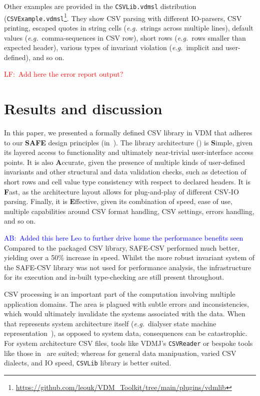 \documentclass[runningheads,a4paper]{llncs}
\newcommand{\abcomment}[1]{{\scriptsize\textcolor{blue}{AB:~#1}}}  %
\newcommand{\lfcomment}[1]{{\scriptsize\textcolor{red}{LF:~#1}}}  %
\begin{document}
Other examples are provided in the \texttt{CSVLib.vdmsl} distribution (\texttt{CSVExample.vdmsl}\footnote{\url{https://github.com/leouk/VDM_Toolkit/tree/main/plugins/vdmlib}}. They show CSV parsing with different IO-parsers, CSV printing, escaped quotes in string cells (\textit{e.g.}~strings across multiple lines), default values (\textit{e.g.}~comma-sequences in CSV row), short rows (\textit{e.g.}~rows smaller than expected header), various types of invariant violation (\textit{e.g.}~implicit and user-defined), and so on. 

\lfcomment{Add here the error report output?}

\section{Results and discussion}\label{sec:Results}

In this paper, we presented a formally defined CSV library in VDM that adheres to our \textbf{SAFE} design principles (in~). The library architecture () is \textbf{S}imple, given its layered access to functionality and ultimately near-trivial user-interface access points. It is also \textbf{A}ccurate, given the presence of multiple kinds of user-defined invariants and other structural and data validation checks, such as detection of short rows and cell value type consistency with respect to declared headers. It is \textbf{F}ast, as the architecture layout allows for plug-and-play of different CSV-IO parsing. Finally, it is \textbf{E}ffective, given its combination of speed, ease of use, multiple capabilities around CSV format handling, CSV settings, errors handling, and so on.   

\abcomment{Added this here Leo to further drive home the performance benefits seen}
Compared to the packaged CSV library, SAFE-CSV performed much better, yielding over a 50\% increase in speed. Whilst the more robust invariant system of the SAFE-CSV library was not used for performance analysis, the infrastructure for its execution and in-built type-checking are still present throughout.  

CSV processing is an important part of the computation involving multiple application domains. The area is plagued with subtle errors and inconsistencies, which would ultimately invalidate the systems associated with the data. When that represents system architecture itself (\textit{e.g.}~dialyser state machine representation~\cite{scp-dialyser}), as opposed to system data, consequences can be catastrophic. For system architecture CSV files, tools like VDMJ's \texttt{CSVReader} or bespoke tools like those in~\cite{egleUG,alastairMSc,emv2} are suited; whereas for general data manipuation, varied CSV dialects, and IO speed, \texttt{CSVLib} library is better suited.
\end{document}
